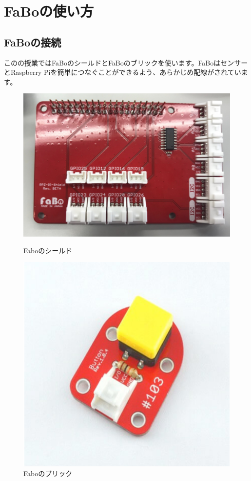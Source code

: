 \section{FaBoの使い方}
\subsection{FaBoの接続}
このの授業ではFaBoのシールドとFaBoのブリックを使います。FaBoはセンサーとRaspberry Piを簡単につなぐことができるよう、あらかじめ配線がされています。

\begin{figure}[htbp]
  \begin{minipage}[b]{0.45\linewidth}
    \centering
    \includegraphics[keepaspectratio, scale=0.6]{images/chap05/text05-img004.png}
    \caption{Faboのシールド}
    \label{fig4}
  \end{minipage}
  \begin{minipage}[b]{0.45\linewidth}
    \centering
    \includegraphics[keepaspectratio, scale=0.6]{images/chap05/text05-img005.png}
    \caption{Faboのブリック}
    \label{fig5}
  \end{minipage}
\end{figure}

